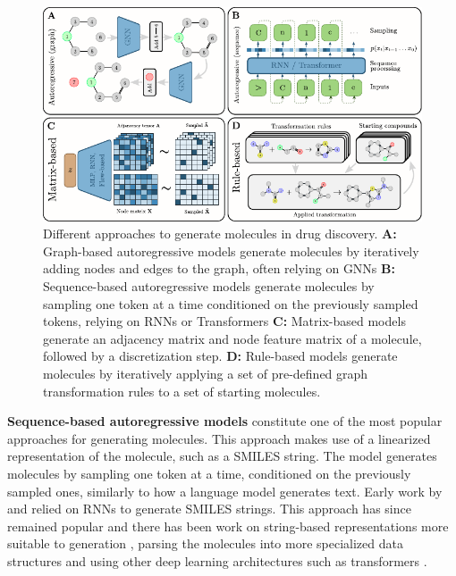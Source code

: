 \begin{figure}[t]
	\centering
	\includegraphics[width=\textwidth]{figures/generation_strategies.pdf}
	\caption{Different approaches to generate molecules in drug discovery. \textbf{A:} Graph-based
		autoregressive models generate molecules by iteratively adding nodes and edges to the graph,
		often relying on \acp{GNN} \textbf{B:} Sequence-based autoregressive models generate
		molecules by sampling one token at a time conditioned on the previously sampled tokens,
		relying on \acp{RNN} or Transformers \textbf{C:} Matrix-based models generate an adjacency
		matrix and node feature matrix of a molecule, followed by a discretization step. \textbf{D:}
		Rule-based models generate molecules by iteratively applying a set of pre-defined graph
		transformation rules to a set of starting molecules. \label{fig:generation-strategies}}
\end{figure}
\textbf{Sequence-based autoregressive models} constitute one of the most popular approaches for
generating molecules. This approach makes use of a linearized representation of the molecule, such
as a SMILES string. The model generates molecules by sampling one token at a time,
conditioned on the previously sampled ones, similarly to how a language model generates text.
Early work by \citet{seglerGeneratingFocusedMolecule2018} and
\citet{gomez-bombarelliAutomaticChemicalDesign2018} relied on \acp{RNN} to
generate SMILES strings. This approach has since remained popular and there has been work on
string-based representations more suitable to generation
\citep{oboyleDeepSMILESAdaptationSMILES2018,krennSelfreferencingEmbeddedStrings2020a,noutahiGottaBeSAFE2024},
parsing the molecules into more specialized data structures
\citep{kusnerGrammarVariationalAutoencoder2017,jinJunctionTreeVariational2018} and using other deep
learning architectures such as transformers
\citep{vaswaniAttentionAllYou2017,noutahiGottaBeSAFE2024,schwallerMolecularTransformerModel2019,bagalMolGPTMolecularGeneration2022,mazuzMoleculeGenerationUsing2023}.

